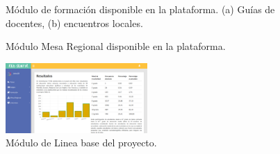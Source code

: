 \documentclass[journal,transmag]{IEEEtran}
\begin{document}
\begin{figure}[tbp]
  \centering
	  \hspace{1mm}
  \caption{Módulo de formación disponible en la plataforma. (a) Guías de docentes, (b) encuentros locales.}
  \label{fig:formacion}
\end{figure}

\begin{figure}[tbp]
  \centering
	  \hspace{1mm}
  \caption{Módulo Mesa Regional disponible en la plataforma. }
  \label{fig:mesa}
\end{figure}

\begin{figure}[tbp]
\centering
\includegraphics[width=0.48\textwidth]{resultados.png}
\caption{Módulo de Linea base del proyecto.}
\label{fig:lineabase}
\end{figure}
\end{document}
